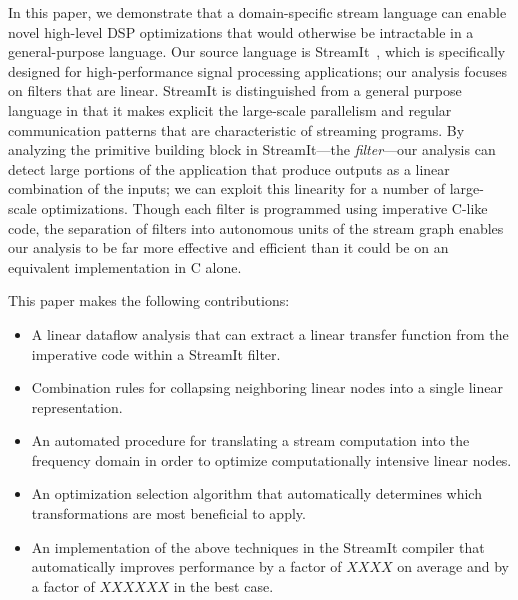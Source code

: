 In this paper, we demonstrate that a domain-specific stream language
can enable novel high-level DSP optimizations that would otherwise be
intractable in a general-purpose language.  Our source language is
StreamIt~\cite{streamit-asplos,gordon-thesis,streamitcc}, which is 
specifically designed for high-performance signal processing applications; 
our analysis focuses on filters that are linear.  StreamIt is
distinguished from a general purpose language in that it makes
explicit the large-scale parallelism and regular communication
patterns that are characteristic of streaming programs.  By analyzing
the primitive building block in StreamIt---the {\it filter}---our analysis
can detect large portions of the application that produce outputs as a
linear combination of the inputs; we can exploit this linearity for a
number of large-scale optimizations.  Though each filter is programmed
using imperative C-like code, the separation of filters into
autonomous units of the stream graph enables our analysis to be far
more effective and efficient than it could be on an equivalent
implementation in C alone.

This paper makes the following contributions:

\begin{itemize}
\vspace{-6pt}

\item A linear dataflow analysis that can extract a linear transfer
function from the imperative code within a StreamIt filter.
\vspace{-6pt}

\item Combination rules for collapsing neighboring linear nodes into a
single linear representation.
\vspace{-6pt}

\item An automated procedure for translating a stream computation into
the frequency domain in order to optimize computationally intensive
linear nodes.
\vspace{-6pt}

\item An optimization selection algorithm that automatically
determines which transformations are most beneficial to apply.
\vspace{-6pt}

\item An implementation of the above techniques in the StreamIt
compiler that automatically improves performance by a factor of
$XXXX$ on average and by a factor of $XXXXXX$ in the best case.
\vspace{-6pt}

\end{itemize}

